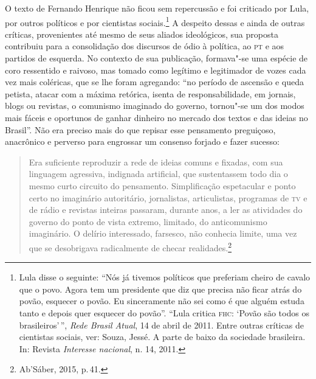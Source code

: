 O texto de Fernando Henrique não ficou sem repercussão e foi criticado
por Lula, por outros políticos e por cientistas sociais.\footnote{Lula
  disse o seguinte: ``Nós já tivemos políticos que preferiam cheiro de
  cavalo que o povo. Agora tem um presidente que diz que precisa não
  ficar atrás do povão, esquecer o povão. Eu sinceramente não sei como é
  que alguém estuda tanto e depois quer esquecer do povão''.
``Lula critica \textsc{fhc}: `Povão são todos os brasileiros'\,'', \emph{Rede Brasil Atual}, 14 de abril de 2011.
  Entre outras críticas de cientistas sociais, ver: Souza, Jessé. A
  parte de baixo da sociedade brasileira. In: Revista \emph{Interesse
  nacional}, n. 14, 2011.} A despeito dessas e ainda de outras
críticas, provenientes até mesmo de seus aliados ideológicos, sua
proposta contribuiu para a consolidação dos discursos de ódio à
política, ao \textsc{pt} e aos partidos de esquerda. No contexto de sua
publicação, formava"-se uma espécie de coro ressentido e raivoso, mas
tomado como legítimo e legitimador de vozes cada vez mais coléricas, que
se lhe foram agregando: ``no período de ascensão e queda petista, atacar
com a máxima retórica, isenta de responsabilidade, em jornais, blogs ou
revistas, o comunismo imaginado do governo, tornou"-se um dos modos mais
fáceis e oportunos de ganhar dinheiro no mercado dos textos e das ideias
no Brasil''. Não era preciso mais do que repisar esse pensamento
preguiçoso, anacrônico e perverso para engrossar um consenso forjado e
fazer sucesso:

\begin{quote}
Era suficiente reproduzir a rede de ideias comuns e fixadas, com sua
linguagem agressiva, indignada artificial, que sustentassem todo dia o
mesmo curto circuito do pensamento. Simplificação espetacular e ponto
certo no imaginário autoritário, jornalistas, articulistas, programas de
\textsc{tv} e de rádio e revistas inteiras passaram, durante anos, a ler as
atividades do governo do ponto de vista extremo, limitado, do
anticomunismo imaginário. O delírio interessado, farsesco, não conhecia
limite, uma vez que se desobrigava radicalmente de checar
realidades.\footnote{Ab'Sáber, 2015, p.\,41.}
\end{quote}

